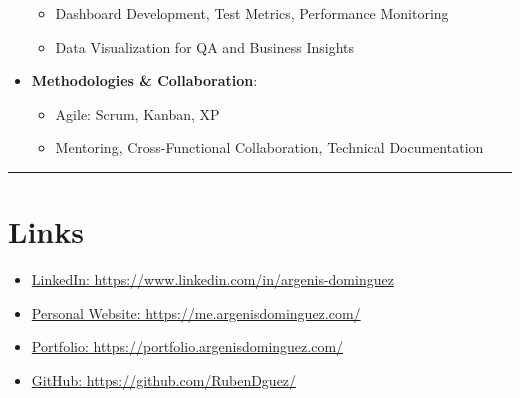 \documentclass[letterpaper,10pt]{article}
\newcommand{\separator}{\vspace{4pt}\hrule\vspace{4pt}}
\begin{document}
\begin{itemize}
{\begin{itemize}
    	\item{Dashboard Development, Test Metrics, Performance Monitoring}
    	\item{Data Visualization for QA and Business Insights}
        \end{itemize}
    }
    \item {
        \textbf{Methodologies \& Collaboration}:
        \begin{itemize}
    	\item{Agile: Scrum, Kanban, XP}
    	\item{Mentoring, Cross-Functional Collaboration, Technical Documentation}
        \end{itemize}
    }
\end{itemize}
\separator
\section*{Links}
\begin{itemize}
    \item \href{https://www.linkedin.com/in/argenis-dominguez/}{LinkedIn: https://www.linkedin.com/in/argenis-dominguez}
    \item \href{https://me.argenisdominguez.com/#/}{Personal Website: https://me.argenisdominguez.com/}
    \item \href{https://portfolio.argenisdominguez.com/#/}{Portfolio: https://portfolio.argenisdominguez.com/}
    \item \href{https://github.com/RubenDguez}{GitHub: https://github.com/RubenDguez/}
\end{itemize}
\end{document}
